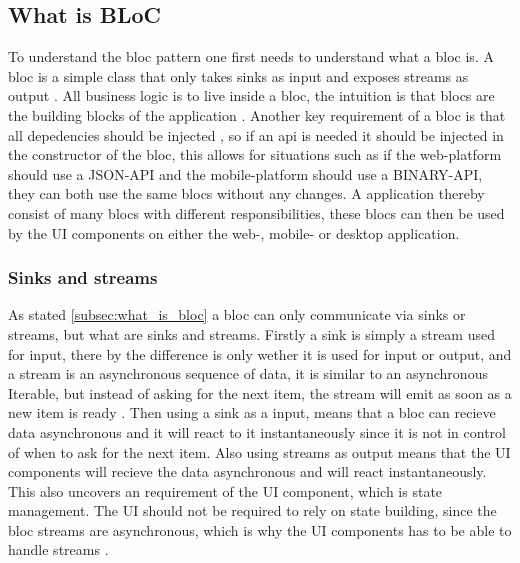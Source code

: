 \subsection{What is BLoC} \label{subsec:what_is_bloc}
To understand the \gls{bloc} pattern one first needs to understand what a \gls{bloc} is. A \gls{bloc} is a simple class that only takes sinks as input and exposes streams as output \cite[21 min 25 sec]{blocPattern}. All business logic is to live inside a \gls{bloc}, the intuition is that \glspl{bloc} are the building blocks of the application \cite[21 min 25 sec]{blocPattern}. Another key requirement of a bloc is that all depedencies should be injected \cite[22 min 55 sec]{blocPattern}, so if an api is needed it should be injected in the constructor of the \gls{bloc}, this allows for situations such as if the web-platform should use a JSON-API and the mobile-platform should use a BINARY-API, they can both use the same \glspl{bloc} without any changes. A application thereby consist of many \glspl{bloc} with different responsibilities, these \glspl{bloc} can then be used by the UI components on either the web-, mobile- or desktop application.

\subsubsection{Sinks and streams}
As stated \autoref{subsec:what_is_bloc} a \gls{bloc} can only communicate via sinks or streams, but what are sinks and streams. Firstly a sink is simply a stream used for input, there by the difference is only wether it is used for input or output, and a stream is an asynchronous sequence of data, it is similar to an asynchronous Iterable, but instead of asking for the next item, the stream will emit as soon as a new item is ready \cite{dartStreams}. Then using a sink as a input, means that a \gls{bloc} can recieve data asynchronous and it will react to it instantaneously since it is not in control of when to ask for the next item. Also using streams as output means that the UI components will recieve the data asynchronous and will react instantaneously. This also uncovers an requirement of the UI component, which is state management. The UI should not be required to rely on state building, since the \gls{bloc} streams are asynchronous, which is why the UI components has to be able to handle streams \cite[4 min 40 sec \& 14min 00 sec]{blocPattern}.

